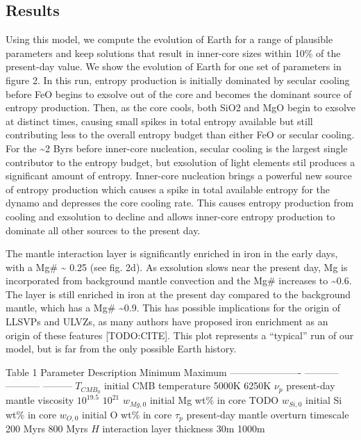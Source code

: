 \documentclass[]{article}
\begin{document}
\hypertarget{results}{%
\subsection{Results}\label{results}}

Using this model, we compute the evolution of Earth for a range of
plausible parameters and keep solutions that result in inner-core sizes
within 10\% of the present-day value. We show the evolution of Earth for
one set of parameters in figure 2. In this run, entropy production is
initially dominated by secular cooling before FeO begins to exsolve out
of the core and becomes the dominant source of entropy production. Then,
as the core cools, both SiO2 and MgO begin to exsolve at distinct times,
causing small spikes in total entropy available but still contributing
less to the overall entropy budget than either FeO or secular cooling.
For the \textasciitilde{}2 Byrs before inner-core nucleation, secular
cooling is the largest single contributor to the entropy budget, but
exsolution of light elements stil produces a significant amount of
entropy. Inner-core nucleation brings a powerful new source of entropy
production which causes a spike in total available entropy for the
dynamo and depresses the core cooling rate. This causes entropy
production from cooling and exsolution to decline and allows inner-core
entropy production to dominate all other sources to the present day.

The mantle interaction layer is significantly enriched in iron in the
early days, with a Mg\# \textasciitilde{} 0.25 (see fig. 2d). As
exsolution slows near the present day, Mg is incorporated from
background mantle convection and the Mg\# increases to
\textasciitilde{}0.6. The layer is still enriched in iron at the present
day compared to the background mantle, which has a Mg\#
\textasciitilde{}0.9. This has possible implications for the origin of
LLSVPs and ULVZs, as many authors have proposed iron enrichment as an
origin of these features {[}TODO:CITE{]}. This plot represents a
``typical'' run of our model, but is far from the only possible Earth
history.

Table 1 \textbar{} Parameter \textbar{} Description \textbar{} Minimum
\textbar{} Maximum \textbar{} \textbar{} ----------------------
\textbar{} ----------- \textbar{} ----------- \textbar{} ---------
\textbar{} \textbar{} \(T_{CMB_0}\) \textbar{} initial CMB temperature
\textbar{} 5000K \textbar{} 6250K \textbar{} \textbar{} \(\nu_p\)
\textbar{} present-day mantle viscosity \textbar{} \(10^{19.5}\)
\textbar{} \(10^{21}\) \textbar{} \textbar{}\(w_{Mg,0}\)\textbar{}
initial Mg wt\% in core \textbar{} TODO \textbar{} \textbar{}
\textbar{}\(w_{Si,0}\)\textbar{} initial Si wt\% in core \textbar{}
\textbar{} \textbar{} \textbar{}\(w_{O,0}\)\textbar{} initial O wt\% in
core \textbar{} \textbar{} \textbar{} \textbar{} \(\tau_p\) \textbar{}
present-day mantle overturn timescale \textbar{} 200 Myrs \textbar{} 800
Myrs \textbar{} \textbar{} \(H\) \textbar{} interaction layer thickness
\textbar{} 30m \textbar{} 1000m \textbar{}
\end{document}
